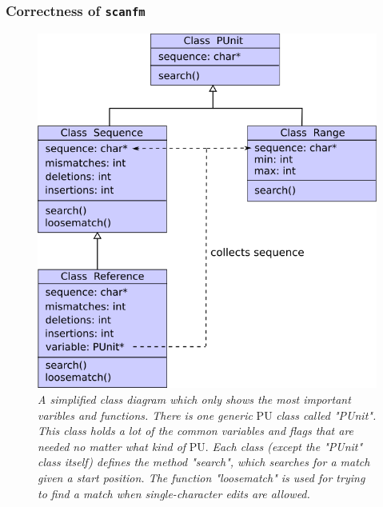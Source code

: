 \documentclass[12pt]{article}
\newcommand{\sfm}{\texttt{scanfm} }
\newcommand{\pu}{PU }
\newcommand{\pup}{PU. }
\begin{document}
\subsubsection{Correctness of \sfm}
\begin{figure}[H]
\begin{center}
\includegraphics[scale=0.7]{Diagrams/classdia.png}
\end{center}
\caption{\textit{A simplified class diagram which only shows the most important varibles and functions.
There is one generic} \pu \textit{class called "PUnit". This class holds a lot of the common variables
and flags that are needed no matter what kind of} \pup
\textit{
Each class (except the "PUnit" class itself) defines the method "search", which searches for a match given a start position. 
The function "loosematch" is used for trying to find a match when single-character edits are allowed.}}
\end{figure}
\end{document}
